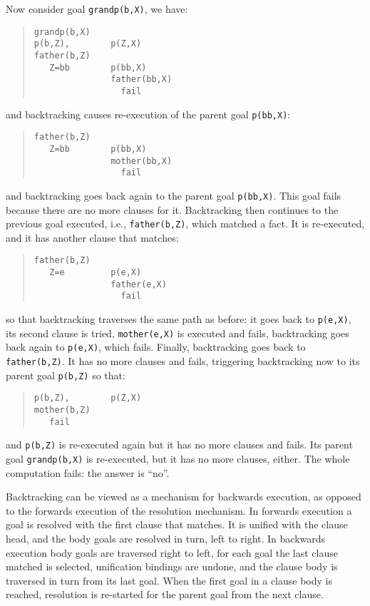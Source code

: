 Now consider goal \verb+grandp(b,X)+, we have:
\begin{quote}
\begin{verbatim}
grandp(b,X)
p(b,Z),        p(Z,X)
father(b,Z)
   Z=bb        p(bb,X)
               father(bb,X)
                 fail
\end{verbatim}
\end{quote}
%
and backtracking causes re-execution of the parent goal \verb+p(bb,X)+:
\begin{quote}
\begin{verbatim}
father(b,Z)
   Z=bb        p(bb,X)
               mother(bb,X)
                 fail
\end{verbatim}
\end{quote}
%
and backtracking goes back again to the parent goal \verb+p(bb,X)+. 
This goal fails because there are no more clauses for it. Backtracking
then continues to the previous goal executed, i.e., \verb+father(b,Z)+, 
which matched a fact. It is re-executed, and it has another clause that
matches: 
\begin{quote}
\begin{verbatim}
father(b,Z)
   Z=e         p(e,X)
               father(e,X)
                 fail
\end{verbatim}
\end{quote}
%
so that backtracking traverses the same path as before: it goes back
to \verb+p(e,X)+, its second clause is tried, \verb+mother(e,X)+ is
executed and fails, backtracking goes back again to \verb+p(e,X)+,
which fails. Finally, backtracking goes back to \verb+father(b,Z)+.
It has no more clauses and fails, triggering backtracking now to
its parent goal \verb+p(b,Z)+ so that: 
\begin{quote}
\begin{verbatim}
p(b,Z),        p(Z,X)
mother(b,Z)
   fail
\end{verbatim}
\end{quote}
%
and \verb+p(b,Z)+ is re-executed again but it has no more clauses and
fails. Its parent goal \verb+grandp(b,X)+ is re-executed, but it has
no more clauses, either. The whole computation fails: the answer is
``no''. 

Backtracking can be viewed as a mechanism for backwards execution, 
as opposed to the forwards execution of the resolution mechanism.
In forwards execution a goal is resolved with the first clause that
matches. It is unified with the clause head, and the body goals are
resolved in turn, left to right. In backwards execution body goals are
traversed right to left, for each goal the last clause matched is
selected, unification bindings are undone, and the clause body is
traversed in turn from its last goal. When the first goal in a clause
body is reached, resolution is re-started for the parent goal from the
next clause. 


